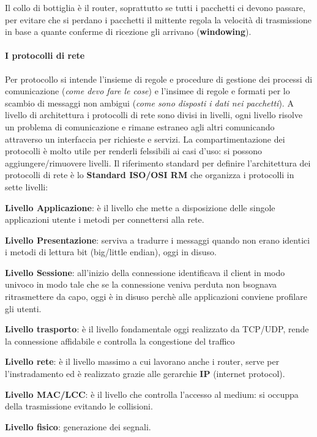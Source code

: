 \documentclass{article}
\begin{document}
Il collo di bottiglia è il router, soprattutto se tutti i pacchetti ci devono
passare, per evitare che si perdano i pacchetti il mittente regola la velocità
di trasmissione in base a quante conferme di ricezione gli arrivano
(\textbf{windowing}).

\paragraph{I protocolli di rete}
Per protocollo si intende l'insieme di regole e procedure di gestione dei
processi di comunicazione (\textit{come devo fare le cose}) e l'insimee di
regole e formati per lo scambio di messaggi non ambigui (\textit{come sono
    disposti i dati nei pacchetti}). A livello di architettura i protocolli di rete
sono divisi in livelli, ogni livello risolve un problema di comunicazione e
rimane estraneo agli altri comunicando attraverso un interfaccia per richieste
e servizi. La compartimentazione dei protocolli è molto utile per renderli
felssibili ai casi d'uso: si possono aggiungere/rimuovere livelli. Il
riferimento standard per definire l'architettura dei protocolli di rete è lo
\textbf{Standard ISO/OSI RM} che organizza i protocolli in sette livelli:
\begin{etaremune}
    \item \textbf{Livello Applicazione}: è il livello che mette a disposizione delle singole applicazioni utente i metodi per connettersi alla rete.
    \item \textbf{Livello Presentazione}: serviva a tradurre i messaggi quando non erano identici i metodi di lettura bit (big/little endian), oggi in disuso.
    \item \textbf{Livello Sessione}: all'inizio della connessione identificava il client in modo univoco in modo tale che se la connessione veniva perduta non bsognava ritrasmettere da capo, oggi è
    in disuso perchè alle applicazioni conviene profilare gli utenti.
    \item \textbf{Livello trasporto}: è il livello fondamentale oggi realizzato da TCP/UDP, rende la connessione affidabile e controlla la congestione del traffico
    \item \textbf{Livello rete}: è il livello massimo a cui lavorano anche i router, serve per l'instradamento ed è realizzato grazie alle gerarchie \textbf{IP} (internet protocol).
    \item \textbf{Livello MAC/LCC}: è il livello che controlla l'accesso al medium: si occuppa della trasmissione evitando le collisioni.
    \item \textbf{Livello fisico}: generazione dei segnali.
\end{etaremune}
\end{document}
